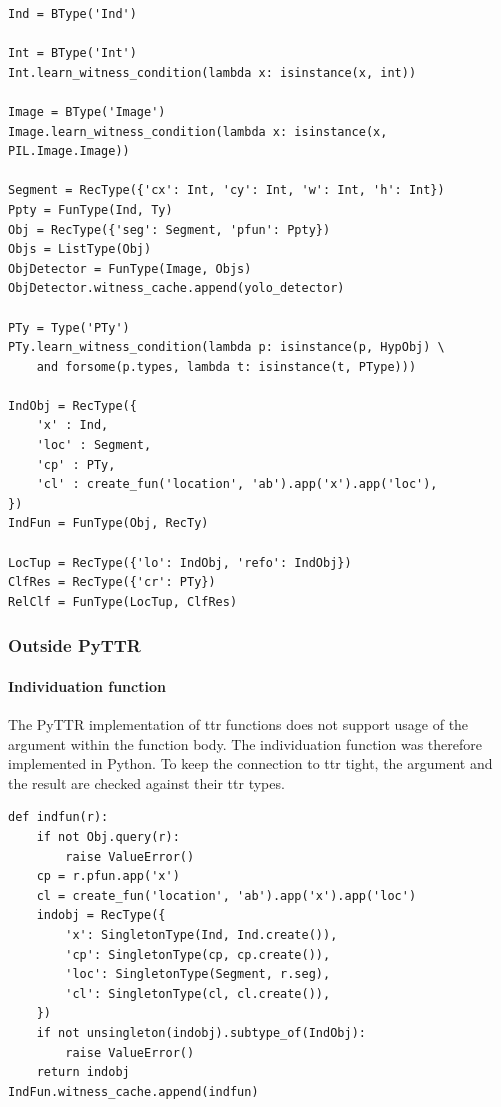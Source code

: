 \begin{lstlisting}[label={lst:pyttrbasic}, caption=TTR type definitions]
Ind = BType('Ind')

Int = BType('Int')
Int.learn_witness_condition(lambda x: isinstance(x, int))

Image = BType('Image')
Image.learn_witness_condition(lambda x: isinstance(x, PIL.Image.Image))

Segment = RecType({'cx': Int, 'cy': Int, 'w': Int, 'h': Int})
Ppty = FunType(Ind, Ty)
Obj = RecType({'seg': Segment, 'pfun': Ppty})
Objs = ListType(Obj)
ObjDetector = FunType(Image, Objs)
ObjDetector.witness_cache.append(yolo_detector)

PTy = Type('PTy')
PTy.learn_witness_condition(lambda p: isinstance(p, HypObj) \
    and forsome(p.types, lambda t: isinstance(t, PType)))

IndObj = RecType({
    'x' : Ind,
    'loc' : Segment,
    'cp' : PTy,
    'cl' : create_fun('location', 'ab').app('x').app('loc'),
})
IndFun = FunType(Obj, RecTy)

LocTup = RecType({'lo': IndObj, 'refo': IndObj})
ClfRes = RecType({'cr': PTy})
RelClf = FunType(LocTup, ClfRes)
\end{lstlisting}



\subsubsection{Outside PyTTR}

\paragraph{Individuation function}

The PyTTR implementation of \gls{ttr} functions does not support usage of the argument within the function body.
The individuation function was therefore implemented in Python.
To keep the connection to \gls{ttr} tight, the argument and the result are checked against their \gls{ttr} types.

\begin{lstlisting}[label={lst:indfun},caption={Individuation function}]
def indfun(r):
    if not Obj.query(r):
        raise ValueError()
    cp = r.pfun.app('x')
    cl = create_fun('location', 'ab').app('x').app('loc')
    indobj = RecType({
        'x': SingletonType(Ind, Ind.create()),
        'cp': SingletonType(cp, cp.create()),
        'loc': SingletonType(Segment, r.seg),
        'cl': SingletonType(cl, cl.create()),
    })
    if not unsingleton(indobj).subtype_of(IndObj):
        raise ValueError()
    return indobj
IndFun.witness_cache.append(indfun)
\end{lstlisting}


